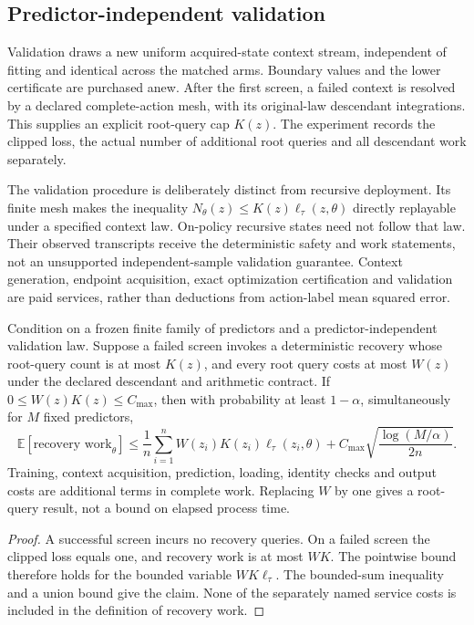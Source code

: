 \subsection{Predictor-independent validation}
Validation draws a new uniform acquired-state context stream, independent of fitting and identical across the matched arms. Boundary values and the lower certificate are purchased anew. After the first screen, a failed context is resolved by a declared complete-action mesh, with its original-law descendant integrations. This supplies an explicit root-query cap $K(z)$. The experiment records the clipped loss, the actual number of additional root queries and all descendant work separately.

The validation procedure is deliberately distinct from recursive deployment. Its finite mesh makes the inequality $N_\theta(z)\le K(z)\ell_\tau(z,\theta)$ directly replayable under a specified context law. On-policy recursive states need not follow that law. Their observed transcripts receive the deterministic safety and work statements, not an unsupported independent-sample validation guarantee. Context generation, endpoint acquisition, exact optimization certification and validation are paid services, rather than deductions from action-label mean squared error.

\begin{proposition}\label{prop:complete-work69}
Condition on a frozen finite family of predictors and a predictor-independent validation law. Suppose a failed screen invokes a deterministic recovery whose root-query count is at most $K(z)$, and every root query costs at most $W(z)$ under the declared descendant and arithmetic contract. If $0\le W(z)K(z)\le C_{\max}$, then with probability at least $1-\alpha$, simultaneously for $M$ fixed predictors,
\[
 \mathbb E[\text{recovery work}_\theta]
 \le\frac1n\sum_{i=1}^n W(z_i)K(z_i)\ell_\tau(z_i,\theta)
       +C_{\max}\sqrt{\frac{\log(M/\alpha)}{2n}}.
\]
Training, context acquisition, prediction, loading, identity checks and output costs are additional terms in complete work. Replacing $W$ by one gives a root-query result, not a bound on elapsed process time.
\end{proposition}
\begin{proof}
A successful screen incurs no recovery queries. On a failed screen the clipped loss equals one, and recovery work is at most $WK$. The pointwise bound therefore holds for the bounded variable $WK\ell_\tau$. The bounded-sum inequality and a union bound give the claim. None of the separately named service costs is included in the definition of recovery work.
\end{proof}

